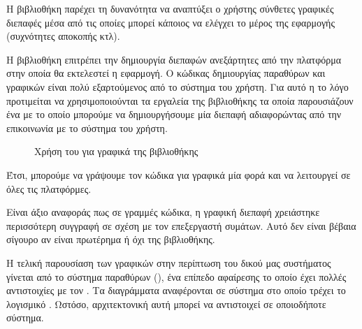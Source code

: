 \documentclass[12pt]{extarticle}
\begin{document}
Η βιβλιοθήκη  παρέχει τη δυνανότητα να αναπτύξει ο χρήστης 
σύνθετες γραφικές διεπαφές μέσα από τις οποίες μπορεί κάποιος να ελέγχει 
το  μέρος της εφαρμογής (συχνότητες αποκοπής κτλ).

Η βιβλιοθήκη  επιτρέπει την δημιουργία διεπαφών 
ανεξάρτητες από την πλατφόρμα στην οποία θα εκτελεστεί η εφαρμογή. 
Ο κώδικας δημιουργίας παραθύρων και γραφικών είναι πολύ εξαρτούμενος από 
το σύστημα του χρήστη. Για αυτό η το λόγο προτιμείται να χρησιμοποιούνται 
τα εργαλεία της βιβλιοθήκης τα οποία παρουσιάζουν ένα  
με το οποίο μπορούμε να δημιουργήσουμε μία διεπαφή αδιαφορώντας από την 
 επικοινωνία με το σύστημα του χρήστη.



\begin{figure}[!htb]
    \centering
    \caption{Χρήση του  για γραφικά της βιβλιοθήκης }
\end{figure}

Έτσι, μπορούμε να γράψουμε τον κώδικα για γραφικά μία φορά και 
να λειτουργεί σε όλες τις πλατφόρμες.

Είναι άξιο αναφοράς πως σε γραμμές κώδικα, η γραφική διεπαφή χρειάστηκε 
περισσότερη συγγραφή σε σχέση με τον επεξεργαστή συμάτων. 
Αυτό δεν είναι βέβαια σίγουρο αν είναι πρωτέρημα ή όχι της βιβλιοθήκης.

Η τελική παρουσίαση των γραφικών στην περίπτωση του δικού μας συστήματος
γίνεται από το σύστημα παραθύρων (), ένα επίπεδο αφαίρεσης
το οποίο έχει πολλές αντιστοιχίες με τον . Τα διαγράμματα \cite{XWindowWebsite}
αναφέρονται σε σύστημα  στο οποίο τρέχει το λογισμικό . \cite{XWiki}
Ωστόσο, αρχιτεκτονική αυτή μπορεί να αντιστοιχεί σε οποιοδήποτε σύστημα.
\end{document}
